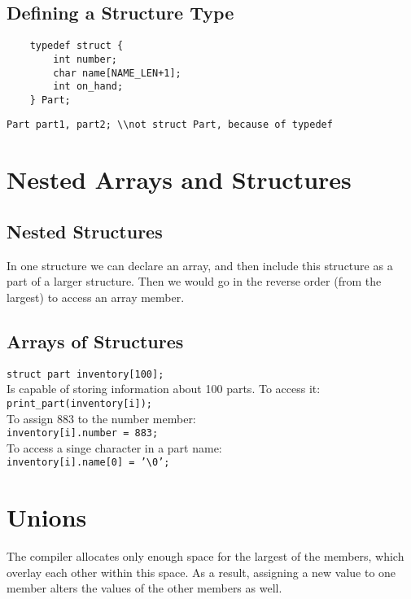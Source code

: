 \documentclass[openany]{book}
\begin{document}
    \subsection*{Defining a Structure Type}

    \begin{lstlisting}
    typedef struct {
        int number;
        char name[NAME_LEN+1];
        int on_hand;
    } Part;
    \end{lstlisting}

    \texttt{Part part1, part2; \textbackslash \textbackslash not struct Part, because of typedef}

    \section{Nested Arrays and Structures}

    \subsection*{Nested Structures}
    In one structure we can declare an array, and then include this structure as a part of a larger structure. Then we would go in the reverse order (from the largest) to access an array member.

    \subsection*{Arrays of Structures}
    \texttt{struct part inventory[100];} \\
    Is capable of storing information about 100 parts. To access it: \\
    \texttt{print\_part(inventory[i]);} \\
    To assign 883 to the number member: \\
    \texttt{inventory[i].number = 883;} \\
    To access a singe character in a part name: \\
    \texttt{inventory[i].name[0] = '\textbackslash 0';} \\

    \section{Unions}
    The compiler allocates only enough space for the largest of the members, which overlay each other within this space. As a result, assigning a new value to one member alters the values of the other members as well.
\end{document}
